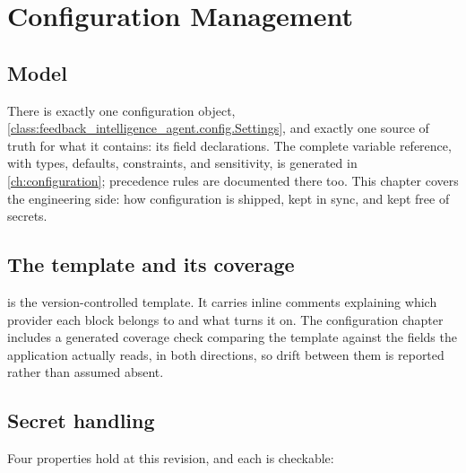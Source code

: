 
\chapter{Configuration Management}
\label{ch:configuration-management}

\section{Model}

There is exactly one configuration object,
\cref{class:feedback_intelligence_agent.config.Settings}, and exactly one
source of truth for what it contains: its field declarations. The complete
variable reference, with types, defaults, constraints, and sensitivity, is
generated in \cref{ch:configuration}; precedence rules are documented there
too. This chapter covers the engineering side: how configuration is shipped,
kept in sync, and kept free of secrets.

\section{The template and its coverage}

 is the version-controlled template. It carries inline
comments explaining which provider each block belongs to and what turns it on.
The configuration chapter includes a generated coverage check comparing the
template against the fields the application actually reads, in both directions,
so drift between them is reported rather than assumed absent.



\section{Secret handling}

Four properties hold at this revision, and each is checkable:

